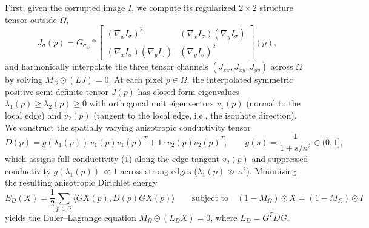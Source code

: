 \documentclass{amsart}
\begin{document}
First, given the corrupted image $I$, we compute its regularized $2 \times 2$ structure tensor outside $\Omega$,
\begin{equation}\label{eq_struct_tensor}
    J_\sigma(p) = G_{\sigma_w} * \begin{bmatrix} (\nabla_x I_\sigma)^2 & (\nabla_x I_\sigma)(\nabla_y I_\sigma) \\ (\nabla_x I_\sigma)(\nabla_y I_\sigma) & (\nabla_y I_\sigma)^2 \end{bmatrix}(p),
\end{equation}
and harmonically interpolate the three tensor channels $(J_{xx}, J_{xy}, J_{yy})$ across $\Omega$ by solving $M_\Omega \odot (L J) = 0$. At each pixel $p \in \Omega$, the interpolated symmetric positive semi-definite tensor $J(p)$ has closed-form eigenvalues $\lambda_1(p) \geq \lambda_2(p) \geq 0$ with orthogonal unit eigenvectors $v_1(p)$ (normal to the local edge) and $v_2(p)$ (tangent to the local edge, i.e., the isophote direction). We construct the spatially varying anisotropic conductivity tensor
\begin{equation}\label{eq_aniso_tensor}
    D(p) = g(\lambda_1(p))\, v_1(p) v_1(p)^T + 1 \cdot v_2(p) v_2(p)^T, \qquad g(s) = \frac{1}{1 + s / \kappa^2} \in (0, 1],
\end{equation}
which assigns full conductivity ($1$) along the edge tangent $v_2(p)$ and suppressed conductivity $g(\lambda_1(p)) \ll 1$ across strong edges ($\lambda_1(p) \gg \kappa^2$). Minimizing the resulting anisotropic Dirichlet energy
\begin{equation}\label{eq_aniso_energy}
    E_D(X) = \frac{1}{2}\sum_{p \in \Omega} \langle G X(p), D(p) G X(p) \rangle \qquad \text{subject to} \quad (1 - M_\Omega) \odot X = (1 - M_\Omega) \odot I
\end{equation}
yields the Euler--Lagrange equation $M_\Omega \odot (L_D X) = 0$, where $L_D = G^T D G$.
\end{document}
